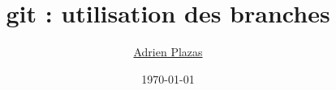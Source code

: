 \usepackage{listings}
\usepackage{hyperref}
\usepackage{verbatim}

\title{\textbf{git : utilisation des branches}}
\author{
  \href{mailto:adrien.plazas@etud.univ-montp2.fr}{Adrien Plazas}
}
\date{\today}



\begin{frame}
\titlepage
\end{frame}




